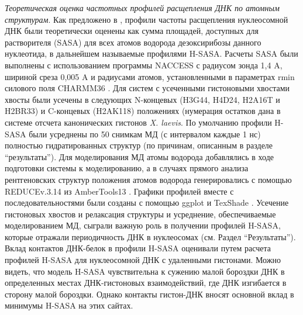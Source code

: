\emph{Теоретическая оценка частотных профилей расщепления ДНК по атомным структурам}. Как предложено в  \cite{balasubramanian_dna_1998}, профили частоты расщепления нуклеосомной ДНК были теоретически оценены как сумма площадей, доступных для растворителя (SASA) для всех атомов водорода дезоксирибозы данного нуклеотида, в дальнейшем называемые профилями H-SASA. Расчеты SASA были выполнены с использованием программы NACCESS \cite{hubbard_naccess_1993} с радиусом зонда 1,4 A, шириной среза 0,005 A и радиусами атомов, установленными в параметрах rmin силового поля CHARMM36 \cite{best_optimization_2012}. Для систем с усеченными гистоновыми хвостами хвосты были усечены в следующих N-концевых (H3G44, H4D24, H2A16T и H2BR33) и C-концевых (H2AK118) положениях (нумерация остатков дана в системе отсчета канонических гистонов \textit{X. laevis}. По умолчанию профили H-SASA были усреднены по 50 снимкам МД (с интервалом каждые 1 нс) полностью гидратированных структур (по причинам, описанным в разделе ``результаты''). Для моделирования МД атомы водорода добавлялись в ходе подготовки системы к моделированию, а в случаях прямого анализа рентгеновских структур положения атомов водорода генерировались с помощью REDUCEv.3.14 из AmberTools13 \cite{word_asparagine_1999}. Графики профилей вместе с последовательностями были созданы с помощью ggplot \cite{wickham_ggplot2_2009} и TexShade \cite{beitz_texshade_2000}. Усечение гистоновых хвостов и релаксация структуры и усреднение, обеспечиваемые моделированием МД, сыграли важную роль в получении профилей H-SASA, которые отражали периодичность ДНК в нуклеосомах (см. Раздел ``Результаты''). Вклад контактов ДНК-белок в профили H-SASA оценивали путем расчета профилей H-SASA для нуклеосомной ДНК с удаленными гистонами. Можно видеть, что модель H-SASA чувствительна к сужению малой бороздки ДНК в определенных местах ДНК-гистоновых взаимодействий, где ДНК изгибается в сторону малой бороздки. Однако контакты гистон-ДНК вносят основной вклад в минимумы H-SASA на этих сайтах.

